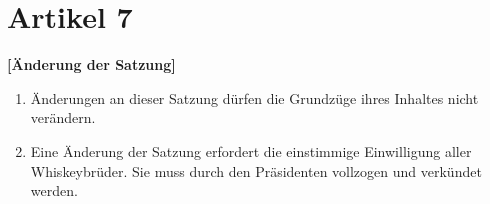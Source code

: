 \documentclass[a4paper,12pt]{article}
\begin{document}
\section*{Artikel 7}
\textbf{[Änderung der Satzung]}

\begin{enumerate}

\item Änderungen an dieser Satzung dürfen die Grundzüge ihres Inhaltes nicht verändern.

\item Eine Änderung der Satzung erfordert die einstimmige Einwilligung aller Whiskeybrüder. Sie muss
  durch den Präsidenten vollzogen und verkündet werden.

\end{enumerate}
\end{document}

